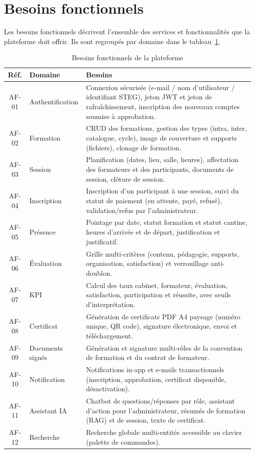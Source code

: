 \documentclass[12pt,a4paper,oneside,openany]{report}
\begin{document}
\section{Besoins fonctionnels}

Les besoins fonctionnels décrivent l'ensemble des services et fonctionnalités que la plateforme doit offrir. Ils sont regroupés par domaine dans le tableau~\ref{tab:bf}.

\begin{table}[H]
\centering
\caption{Besoins fonctionnels de la plateforme}
\begin{tabular}{|c|p{2.6cm}|p{10cm}|}
\hline
\textbf{Réf.} & \textbf{Domaine} & \textbf{Besoins} \\
\hline
AF-01 & Authentification & Connexion sécurisée (e-mail / nom d'utilisateur / identifiant STEG), jeton JWT et jeton de rafraîchissement, inscription des nouveaux comptes soumise à approbation. \\
\hline
AF-02 & Formation & CRUD des formations, gestion des types (intra, inter, catalogue, cycle), image de couverture et supports (fichiers), clonage de formation. \\
\hline
AF-03 & Session & Planification (dates, lieu, salle, heures), affectation des formateurs et des participants, documents de session, clôture de session. \\
\hline
AF-04 & Inscription & Inscription d'un participant à une session, suivi du statut de paiement (en attente, payé, refusé), validation/refus par l'administrateur. \\
\hline
AF-05 & Présence & Pointage par date, statut formation et statut cantine, heures d'arrivée et de départ, justification et justificatif. \\
\hline
AF-06 & Évaluation & Grille multi-critères (contenu, pédagogie, supports, organisation, satisfaction) et verrouillage anti-doublon. \\
\hline
AF-07 & KPI & Calcul des taux cabinet, formateur, évaluation, satisfaction, participation et réussite, avec seuils d'interprétation. \\
\hline
AF-08 & Certificat & Génération de certificats PDF A4 paysage (numéro unique, QR code), signature électronique, envoi et téléchargement. \\
\hline
AF-09 & Documents signés & Génération et signature multi-rôles de la convention de formation et du contrat de formateur. \\
\hline
AF-10 & Notification & Notifications in-app et e-mails transactionnels (inscription, approbation, certificat disponible, désactivation). \\
\hline
AF-11 & Assistant IA & Chatbot de questions/réponses par rôle, assistant d'action pour l'administrateur, résumés de formation (RAG) et de session, texte de certificat. \\
\hline
AF-12 & Recherche & Recherche globale multi-entités accessible au clavier (palette de commandes). \\
\hline
\end{tabular}
\label{tab:bf}
\end{table}
\end{document}
